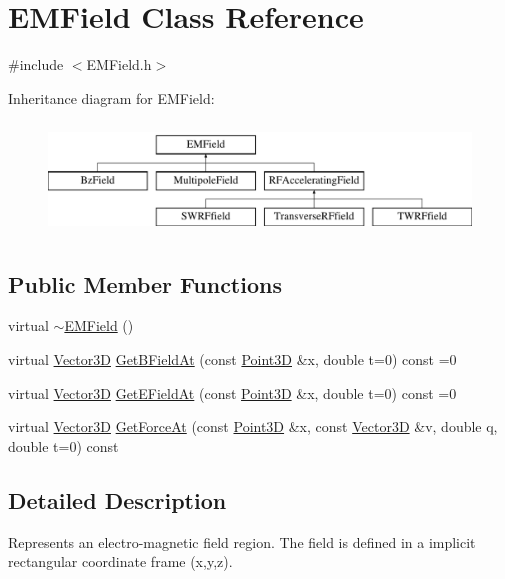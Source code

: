 \hypertarget{classEMField}{}\section{E\+M\+Field Class Reference}
\label{classEMField}


{\ttfamily \#include $<$E\+M\+Field.\+h$>$}

Inheritance diagram for E\+M\+Field\+:\begin{figure}[H]
\begin{center}
\leavevmode
\includegraphics[height=3.000000cm]{classEMField}
\end{center}
\end{figure}
\subsection*{Public Member Functions}
\begin{DoxyCompactItemize}
\item 
virtual \hyperlink{classEMField_a6b0decf0b473356a847f72d73c291878}{$\sim$\+E\+M\+Field} ()
\item 
virtual \hyperlink{classTVec3D}{Vector3D} \hyperlink{classEMField_ab1ce822878e2facc77f836e3eeea7fd8}{Get\+B\+Field\+At} (const \hyperlink{classTVec3D}{Point3D} \&x, double t=0) const =0
\item 
virtual \hyperlink{classTVec3D}{Vector3D} \hyperlink{classEMField_a3b1045b1ab38a337478c9a94ac6c1852}{Get\+E\+Field\+At} (const \hyperlink{classTVec3D}{Point3D} \&x, double t=0) const =0
\item 
virtual \hyperlink{classTVec3D}{Vector3D} \hyperlink{classEMField_aa00f4f213a55c9223f6ca08463a57691}{Get\+Force\+At} (const \hyperlink{classTVec3D}{Point3D} \&x, const \hyperlink{classTVec3D}{Vector3D} \&v, double q, double t=0) const
\end{DoxyCompactItemize}


\subsection{Detailed Description}
Represents an electro-\/magnetic field region. The field is defined in a implicit rectangular coordinate frame (x,y,z). 

